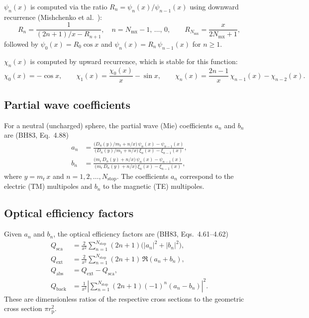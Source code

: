 \documentclass[a4paper,11pt]{article}
\begin{document}
$\psi_n(x)$ is computed via the ratio
$R_n = \psi_n(x)/\psi_{n-1}(x)$ using downward recurrence
(Mishchenko et al.\ \cite{mishchenko2002}):
\begin{equation}
  R_n = \frac{1}{(2n+1)/x - R_{n+1}},
  \quad n = N_\mathrm{mx}-1,\, \ldots,\, 0,
  \qquad
  R_{N_\mathrm{mx}} = \frac{x}{2N_\mathrm{mx}+1},
  \label{eq:psi-ratio-recurrence}
\end{equation}
followed by $\psi_0(x) = R_0 \cos x$ and
$\psi_n(x) = R_n\, \psi_{n-1}(x)$ for $n \ge 1$.

$\chi_n(x)$ is computed by upward recurrence, which is stable for this
function:
\begin{equation}
  \chi_0(x) = -\cos x, \qquad
  \chi_1(x) = \frac{\chi_0(x)}{x} - \sin x, \qquad
  \chi_n(x) = \frac{2n-1}{x}\,\chi_{n-1}(x) - \chi_{n-2}(x).
  \label{eq:chi-recurrence}
\end{equation}

\subsection{Partial wave coefficients}
\label{sec:partial-wave}

For a neutral (uncharged) sphere, the partial wave (Mie) coefficients $a_n$ and
$b_n$ are (BH83, Eq.~4.88)
\begin{align}
  a_n &= \frac{
    \bigl(D_n(y)/m_\mathrm{r} + n/x\bigr)\,\psi_n(x) - \psi_{n-1}(x)
  }{
    \bigl(D_n(y)/m_\mathrm{r} + n/x\bigr)\,\xi_n(x) - \xi_{n-1}(x)
  },
  \label{eq:an-neutral} \\[6pt]
  b_n &= \frac{
    \bigl(m_\mathrm{r}\,D_n(y) + n/x\bigr)\,\psi_n(x) - \psi_{n-1}(x)
  }{
    \bigl(m_\mathrm{r}\,D_n(y) + n/x\bigr)\,\xi_n(x) - \xi_{n-1}(x)
  },
  \label{eq:bn-neutral}
\end{align}
where $y = m_\mathrm{r}\, x$ and $n = 1, 2, \ldots, N_\mathrm{stop}$.
The coefficients $a_n$ correspond to the electric (TM) multipoles and $b_n$ to
the magnetic (TE) multipoles.

\subsection{Optical efficiency factors}
\label{sec:efficiency-factors}

Given $a_n$ and $b_n$, the optical efficiency factors are (BH83,
Eqs.~4.61--4.62)
\begin{align}
  Q_\mathrm{sca} &= \frac{2}{x^2}
    \sum_{n=1}^{N_\mathrm{stop}} (2n+1)\bigl(|a_n|^2 + |b_n|^2\bigr),
  \label{eq:qsca} \\
  Q_\mathrm{ext} &= \frac{2}{x^2}
    \sum_{n=1}^{N_\mathrm{stop}} (2n+1)\,\Re(a_n + b_n),
  \label{eq:qext} \\
  Q_\mathrm{abs} &= Q_\mathrm{ext} - Q_\mathrm{sca},
  \label{eq:qabs} \\
  Q_\mathrm{back} &= \frac{1}{x^2}
    \left|\sum_{n=1}^{N_\mathrm{stop}} (2n+1)(-1)^n (a_n - b_n)\right|^2.
  \label{eq:qback}
\end{align}
These are dimensionless ratios of the respective cross sections to the
geometric cross section $\pi r_\mathrm{p}^2$.
\end{document}
